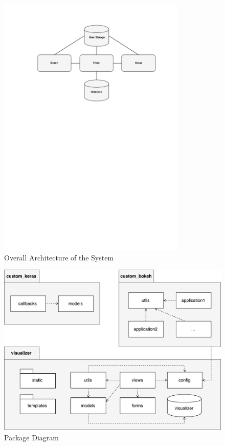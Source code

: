 \begin{figure}[h!]
    \centering
        \includegraphics[width=0.8\textwidth]{fig/overall-architecture.pdf}
        \caption{Overall Architecture of the System}
        \label{fig:overall-architecture}
\end{figure}

\begin{figure}[h!]
    \centering
        \includegraphics[width=\textwidth]{fig/package-diagram.pdf}
        \caption{Package Diagram}
        \label{fig:package-diagram}
\end{figure}

